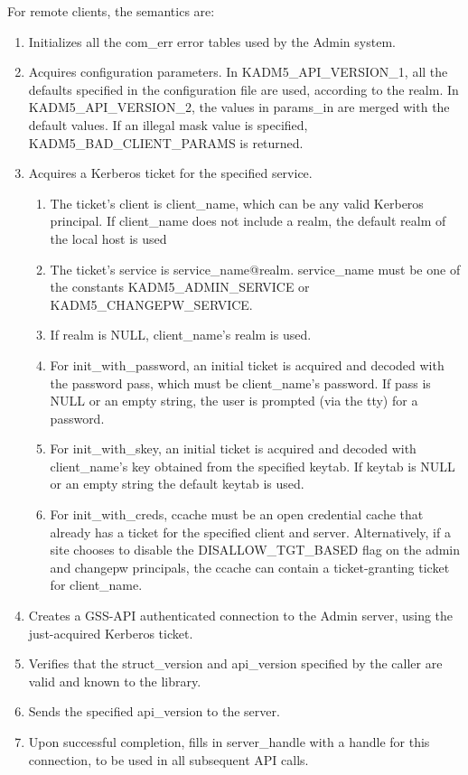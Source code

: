 For remote clients, the semantics are:

\begin{enumerate}
\item Initializes all the com_err error tables used by the Admin
system.

\item Acquires configuration parameters.  In KADM5_API_VERSION_1, all
the defaults specified in the configuration file are used, according
to the realm.  In KADM5_API_VERSION_2, the values in params_in are
merged with the default values.  If an illegal mask value is
specified, KADM5_BAD_CLIENT_PARAMS is returned.

\item Acquires a Kerberos ticket for the specified service.

\begin{enumerate}
\item The ticket's client is client_name, which can be any valid
Kerberos principal.  If client_name does not include a realm, the
default realm of the local host is used
\item The ticket's service is service_name@realm.  service_name must
be one of the constants KADM5_ADMIN_SERVICE or
KADM5_CHANGEPW_SERVICE.
\item If realm is NULL, client_name's realm is used.

\item For init_with_password, an initial ticket is acquired and
decoded with the password pass, which must be client_name's password.
If pass is NULL or an empty string, the user is prompted (via the tty)
for a password.

\item For init_with_skey, an initial ticket is acquired and decoded
with client_name's key obtained from the specified keytab.  If keytab
is NULL or an empty string the default keytab is used.

\item For init_with_creds, ccache must be an open credential cache
that already has a ticket for the specified client and server.
Alternatively, if a site chooses to disable the DISALLOW_TGT_BASED
flag on the admin and changepw principals, the ccache can contain a
ticket-granting ticket for client_name.
\end{enumerate}

\item Creates a GSS-API authenticated connection to the Admin server,
using the just-acquired Kerberos ticket.

\item Verifies that the struct_version and api_version specified by
the caller are valid and known to the library.

\item Sends the specified api_version to the server.

\item Upon successful completion, fills in server_handle with a handle
for this connection, to be used in all subsequent API calls.
\end{enumerate}

